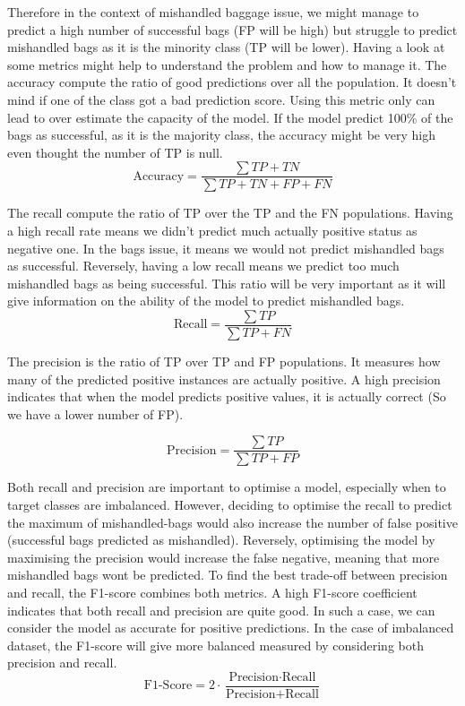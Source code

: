 \documentclass[12pt]{article}
\begin{document}
\noindent Therefore in the context of mishandled baggage issue, we might manage to predict a high number of successful bags (FP will be high) but struggle to predict mishandled bags as it is the minority class (TP will be lower). 
Having a look at some metrics might help to understand the problem and how to manage it.
The accuracy compute the ratio of good predictions over all the population. It doesn't mind if one of the class got a bad prediction score. Using this metric only can lead to over estimate the capacity of the model. If the model predict 100\% of the bags as successful, as it is the majority class, the accuracy might be very high even thought the number of TP is null. 
\begin{equation}
\text{Accuracy} = \frac{\sum{TP + TN}}{\sum{TP + TN + FP + FN}}    
\end{equation}

The recall compute the ratio of TP over the TP and the FN populations. Having a high recall rate means we didn't predict much actually positive status as negative one. In the bags issue, it means we would not predict mishandled bags as successful. Reversely, having a low recall means we predict too much mishandled bags as being successful. This ratio will be very important as it will give information on the ability of the model to predict mishandled bags.
\begin{equation}\label{equation:Recall}
\text{Recall} = \frac{\sum{TP}}{\sum{TP + FN}}    
\end{equation}

The precision is the ratio of TP over TP and FP populations. It measures how many of the predicted positive instances are actually positive. A high precision indicates that when the model predicts positive values, it is actually correct (So we have a lower number of FP).

\begin{equation}\label{equation:Precision}
\text{Precision} = \frac{\sum{TP}}{\sum{TP + FP}}
\end{equation}

\noindent Both recall and precision are important to optimise a model, especially when to target classes are imbalanced. However, deciding to optimise the recall to predict the maximum of mishandled-bags would also increase the number of false positive (successful bags predicted as mishandled). Reversely, optimising the model by maximising the precision would increase the false negative, meaning that more mishandled bags wont be predicted. 
To find the best trade-off between precision and recall, the F1-score combines both metrics. A high F1-score coefficient indicates that both recall and precision are quite good. In such a case, we can consider the model as accurate for positive predictions. In the case of imbalanced dataset, the F1-score will give more balanced measured by considering both precision and recall. 
\begin{equation}\label{equation:F1-score}
\text{F1-Score} = 2 \cdot \frac{\text{Precision} \cdot \text{Recall}}{\text{Precision} + \text{Recall}}    
\end{equation}
\end{document}
